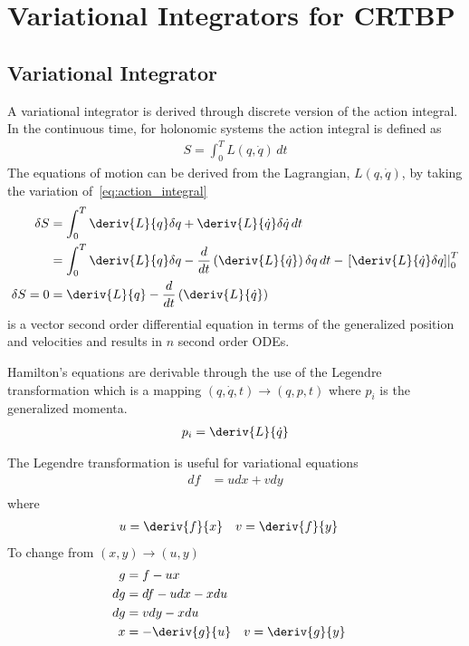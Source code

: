 
\chapter{Variational Integrators for CRTBP}
\section{Variational Integrator}
A variational integrator is derived through discrete version of the action integral.
In the continuous time, for holonomic systems the action integral is defined as
\begin{align}\label{eq:action_integral}
	S = \int_{0}^T L\left( q, \dot{q}\right) \, dt
\end{align}
The equations of motion can be derived from the Lagrangian, \( L\left(q, \dot{q} \right) \), by taking the variation of~\cref{eq:action_integral}
\begin{align}\label{eq:el_eq}
	\delta S &= \int_{0}^T \deriv{L}{q} \delta q + \deriv{L}{\dot{q}} \delta \dot{q} \, dt \\
		&= \int_{0}^T \deriv{L}{q} \delta q - \frac{d}{dt} \left( \deriv{L}{\dot{q}}\right) \delta q \, dt - \left. \left[ \deriv{L}{\dot{q}} \delta q\right] \right|_0^T \\
	\delta S = 0 &= \deriv{L}{q} - \frac{d}{dt} \left( \deriv{L}{\dot{q}}	\right)
\end{align}
 is a vector second order differential equation in terms of the generalized position and velocities and results in \( n\) second order ODEs.

Hamilton's equations are derivable through the use of the Legendre transformation which is a mapping \( \left( q, \dot{q},t\right) \rightarrow \left(q, p, t \right) \) where \( p_i\) is the generalized momenta.
\begin{align}\label{eq:legendre_transform}
	p_i = \deriv{L}{\dot{q}}
\end{align}

The Legendre transformation is useful for variational equations
\begin{align*}
	df &= u dx + v dy \\
\end{align*}
where
\begin{align*}
	u &= \deriv{f}{x} & v &= \deriv{f}{y}
\end{align*}
To change from \( \left( x, y\right) \rightarrow \left(u,y \right) \)
\begin{align*}
	g &= f - u x\\
	dg &= df - u dx - x du\\
	dg &= v dy - x du \\
	x&= -\deriv{g}{u} & v&= \deriv{g}{y}
\end{align*}

